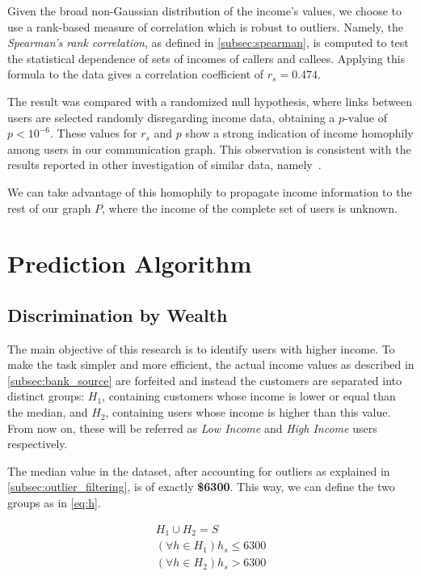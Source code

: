 Given the broad non-Gaussian distribution of the income's values, we choose to use a rank-based measure of correlation which is robust to outliers.
Namely, the \textit{Spearman's rank correlation}, as defined in \cref{subsec:spearman}, is computed to test the statistical dependence of sets of incomes of callers and callees. Applying this formula to the data gives a correlation coefficient of $r_s = 0.474$.

The result was compared with a randomized null hypothesis, where links between users are selected randomly disregarding income data, obtaining a $p\text{-value}$ of $p < 10^{-6}$. These values for $r_s$ and $p$ show a strong indication of income homophily among users in our communication graph. This observation is consistent with the results reported in other investigation of similar data, namely~\cite{leo2015socioeconomic}.

We can take advantage of this homophily to propagate income information to the rest of our graph $P$, where the income of the complete set of users is unknown.

\section{Prediction Algorithm}
\label{subsec:prediction_algorithm}

\subsection{Discrimination by Wealth}
\label{subsec:discrimination_by_wealth}

The main objective of this research is to identify users with higher income. To make the task simpler and more efficient, the actual income values as described in \cref{subsec:bank_source} are forfeited and instead the customers are separated into distinct groups: $H_1$, containing customers whose income is lower or equal than the median, and $H_2$, containing users whose income is higher than this value. From now on, these will be referred as \emph{Low Income} and \emph{High Income} users respectively.

The median value in the dataset, after accounting for outliers as explained in \cref{subsec:outlier_filtering}, is of exactly \textbf{\$6300}. This way, we can define the two groups as in \cref{eq:h}.

\begin{equation}
\label{eq:h}
\begin{gathered}
H_1 \cup H_2 = S \\
\left( \forall h \in H_1 \right) h_s \leq 6300 \\
\left( \forall h \in H_2 \right) h_s > 6300
\end{gathered}
\end{equation}

